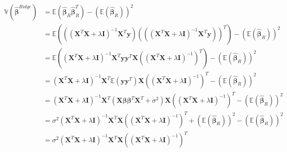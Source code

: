 \begin{align*}
    \mathbb{V}(\boldsymbol{\hat{\beta}}^{Ridge}) &= \mathbb{E} (\boldsymbol{\hat{\beta}}_{R} \boldsymbol{\hat{\beta}}_{R}^{T}) - (\mathbb{E} (\boldsymbol{\hat{\beta}}_{R}))^{2} \\
    &= \mathbb{E} (((\boldsymbol{X}^{T}\boldsymbol{X} + \lambda \boldsymbol{I})^{-1} \boldsymbol{X}^{T} \boldsymbol{y}) (((\boldsymbol{X}^{T}\boldsymbol{X} + \lambda \boldsymbol{I})^{-1} \boldsymbol{X}^{T} \boldsymbol{y}))^{T}) - (\mathbb{E} (\boldsymbol{\hat{\beta}}_{R}))^{2} \\
    &= \mathbb{E} ((\boldsymbol{X}^{T}\boldsymbol{X} + \lambda \boldsymbol{I})^{-1} \boldsymbol{X}^{T} \boldsymbol{y} \boldsymbol{y}^{T} \boldsymbol{X} ((\boldsymbol{X}^{T}\boldsymbol{X} + \lambda \boldsymbol{I})^{-1})^{T} ) - (\mathbb{E} (\boldsymbol{\hat{\beta}}_{R}))^{2} \\
    &= (\boldsymbol{X}^{T}\boldsymbol{X} + \lambda \boldsymbol{I})^{-1} \boldsymbol{X}^{T} \mathbb{E} (\boldsymbol{y} \boldsymbol{y}^{T} ) \boldsymbol{X} ((\boldsymbol{X}^{T}\boldsymbol{X} + \lambda \boldsymbol{I})^{-1})^{T} - (\mathbb{E} (\boldsymbol{\hat{\beta}}_{R}))^{2} \\
    &= (\boldsymbol{X}^{T}\boldsymbol{X} + \lambda \boldsymbol{I})^{-1} \boldsymbol{X}^{T} (\boldsymbol{X} \boldsymbol{\beta} \boldsymbol{\beta}^{T} \boldsymbol{X}^{T} + \sigma^{2}) \boldsymbol{X} ((\boldsymbol{X}^{T}\boldsymbol{X} + \lambda \boldsymbol{I})^{-1})^{T} - (\mathbb{E} (\boldsymbol{\hat{\beta}}_{R}))^{2} \\
    &= \sigma^{2}(\boldsymbol{X}^{T}\boldsymbol{X} + \lambda \boldsymbol{I})^{-1} \boldsymbol{X}^{T} \boldsymbol{X} ((\boldsymbol{X}^{T}\boldsymbol{X} + \lambda \boldsymbol{I})^{-1})^{T} + (\mathbb{E} (\boldsymbol{\hat{\beta}}_{R}))^{2} - (\mathbb{E} (\boldsymbol{\hat{\beta}}_{R}))^{2} \\
    &= \sigma^{2}(\boldsymbol{X}^{T}\boldsymbol{X} + \lambda \boldsymbol{I})^{-1} \boldsymbol{X}^{T} \boldsymbol{X} ((\boldsymbol{X}^{T}\boldsymbol{X} + \lambda \boldsymbol{I})^{-1})^{T} \\
\end{align*}


